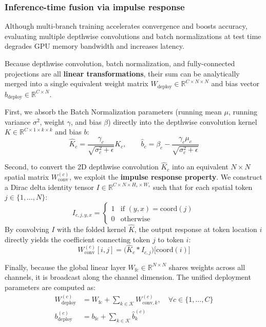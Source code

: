 \subsubsection{Inference-time fusion via impulse response}
Although multi-branch training accelerates convergence and boosts accuracy, evaluating multiple depthwise convolutions and batch normalizations at test time degrades GPU memory bandwidth and increases latency.

Because depthwise convolution, batch normalization, and fully-connected projections are all \textbf{linear transformations}, their sum can be analytically merged into a single equivalent weight matrix $W_{\text{deploy}} \in \mathbb{R}^{C \times N \times N}$ and bias vector $b_{\text{deploy}} \in \mathbb{R}^{C \times N}$.

First, we absorb the Batch Normalization parameters (running mean $\mu$, running variance $\sigma^2$, weight $\gamma$, and bias $\beta$) directly into the depthwise convolution kernel $K \in \mathbb{R}^{C \times 1 \times k \times k}$ and bias $b$:
\begin{equation}
    \widehat{K}_c = \frac{\gamma_c}{\sqrt{\sigma_c^2 + \epsilon}} K_c, \qquad \widehat{b}_c = \beta_c - \frac{\gamma_c \mu_c}{\sqrt{\sigma_c^2 + \epsilon}}
\end{equation}

Second, to convert the 2D depthwise convolution $\widehat{K}_c$ into an equivalent $N \times N$ spatial matrix $W_{\text{conv}}^{(c)}$, we exploit the \textbf{impulse response property}. We construct a Dirac delta identity tensor $I \in \mathbb{R}^{C \times N \times H_s \times W_s}$ such that for each spatial token $j \in \{1, \dots, N\}$:
\begin{equation}
    I_{c, j, y, x} = 
    \begin{cases} 
        1 & \text{if } (y, x) = \text{coord}(j) \\
        0 & \text{otherwise}
    \end{cases}
\end{equation}
By convolving $I$ with the folded kernel $\widehat{K}$, the output response at token location $i$ directly yields the coefficient connecting token $j$ to token $i$:
\begin{equation}
    W_{\text{conv}}^{(c)}[i, j] = \Big(\widehat{K}_c * I_{c, j}\Big)\big[\text{coord}(i)\big]
\end{equation}

Finally, because the global linear layer $W_{\text{fc}} \in \mathbb{R}^{N \times N}$ shares weights across all channels, it is broadcast along the channel dimension. The unified deployment parameters are computed as:
\begin{align}
    W_{\text{deploy}}^{(c)} &= W_{\text{fc}} + \sum_{k \in \mathcal{K}} W_{\text{conv}, k}^{(c)}, \quad \forall c \in \{1, \dots, C\} \\
    b_{\text{deploy}}^{(c)} &= b_{\text{fc}} + \sum_{k \in \mathcal{K}} \widehat{b}_k^{(c)}
\end{align}

